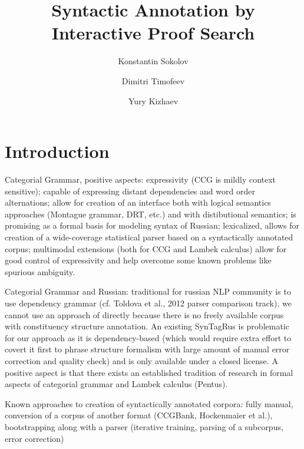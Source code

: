 \documentclass[a4paper]{article}
\theoremstyle{example-style}
\begin{document}
\title{Syntactic Annotation by Interactive Proof Search}
\author[1]{Konstantin Sokolov}
\author[2]{Dimitri Timofeev}
\author[3]{Yury Kizhaev}
\date{}

\maketitle

\section{Introduction}

  Categorial Grammar, positive aspects: expressivity (CCG is mildly context sensitive); capable of expressing distant 
dependencies and word order alternations; allow for creation of an interface both with logical semantics approaches (Montague grammar, DRT, etc.) and with distibutional semantics; is promising as a formal basis for modeling syntax of Russian;  lexicalized, allows for creation of a wide-coverage statistical parser based on a syntactically annotated corpus; multimodal extensions (both for CCG and Lambek calculus) allow for good control of expressivity and help overcome some known problems like spurious ambiguity.

  Categorial Grammar and Russian: traditional for russian NLP community is to use dependency grammar (cf. Toldova et al., 2012 parser comparison track), we cannot use an approach of \parencite{hockenmaier2007ccgbank} directly because there is no freely available  corpus with constituency structure annotation. An existing SynTagRus is problematic for our approach as it is dependency-based (which would require extra effort to covert it first to phrase structure formalism with large amount of manual error correction and quality check) and is only available under a closed license. A positive aspect is that there exists an established tradition of research in formal aspects of categorial grammar and Lambek calculus (Pentus).
  
  Known approaches to creation of syntactically annotated corpora: 
    fully manual,
    conversion of a corpus of another format (CCGBank, Hockenmaier et al.),
    bootstrapping along with a parser (iterative training, parsing of a subcorpus, error correction)
    
\end{document}
